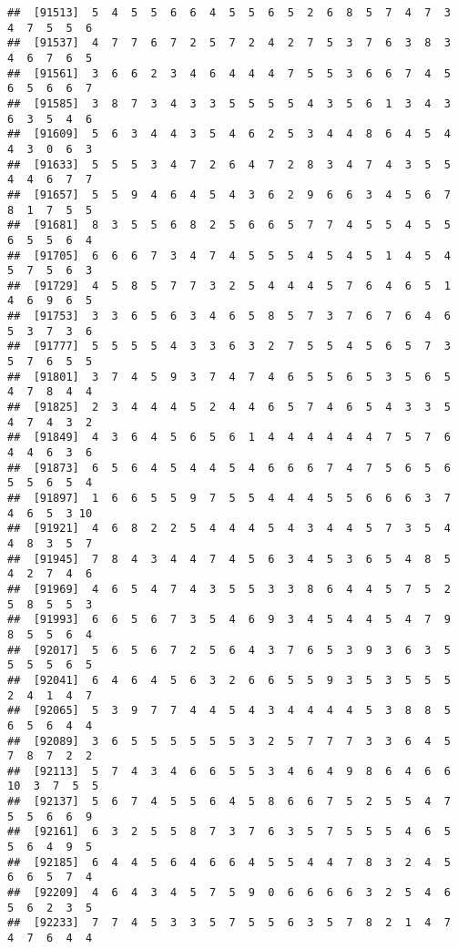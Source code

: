 \documentclass[
]{book}
\begin{document}
\begin{verbatim}
##  [91513]  5  4  5  5  6  6  4  5  5  6  5  2  6  8  5  7  4  7  3  4  7  5  5  6
##  [91537]  4  7  7  6  7  2  5  7  2  4  2  7  5  3  7  6  3  8  3  4  6  7  6  5
##  [91561]  3  6  6  2  3  4  6  4  4  4  7  5  5  3  6  6  7  4  5  6  5  6  6  7
##  [91585]  3  8  7  3  4  3  3  5  5  5  5  4  3  5  6  1  3  4  3  6  3  5  4  6
##  [91609]  5  6  3  4  4  3  5  4  6  2  5  3  4  4  8  6  4  5  4  4  3  0  6  3
##  [91633]  5  5  5  3  4  7  2  6  4  7  2  8  3  4  7  4  3  5  5  4  4  6  7  7
##  [91657]  5  5  9  4  6  4  5  4  3  6  2  9  6  6  3  4  5  6  7  8  1  7  5  5
##  [91681]  8  3  5  5  6  8  2  5  6  6  5  7  7  4  5  5  4  5  5  6  5  5  6  4
##  [91705]  6  6  6  7  3  4  7  4  5  5  5  4  5  4  5  1  4  5  4  5  7  5  6  3
##  [91729]  4  5  8  5  7  7  3  2  5  4  4  4  5  7  6  4  6  5  1  4  6  9  6  5
##  [91753]  3  3  6  5  6  3  4  6  5  8  5  7  3  7  6  7  6  4  6  5  3  7  3  6
##  [91777]  5  5  5  5  4  3  3  6  3  2  7  5  5  4  5  6  5  7  3  5  7  6  5  5
##  [91801]  3  7  4  5  9  3  7  4  7  4  6  5  5  6  5  3  5  6  5  4  7  8  4  4
##  [91825]  2  3  4  4  4  5  2  4  4  6  5  7  4  6  5  4  3  3  5  4  7  4  3  2
##  [91849]  4  3  6  4  5  6  5  6  1  4  4  4  4  4  4  7  5  7  6  4  4  6  3  6
##  [91873]  6  5  6  4  5  4  4  5  4  6  6  6  7  4  7  5  6  5  6  5  5  6  5  4
##  [91897]  1  6  6  5  5  9  7  5  5  4  4  4  5  5  6  6  6  3  7  4  6  5  3 10
##  [91921]  4  6  8  2  2  5  4  4  4  5  4  3  4  4  5  7  3  5  4  4  8  3  5  7
##  [91945]  7  8  4  3  4  4  7  4  5  6  3  4  5  3  6  5  4  8  5  4  2  7  4  6
##  [91969]  4  6  5  4  7  4  3  5  5  3  3  8  6  4  4  5  7  5  2  5  8  5  5  3
##  [91993]  6  6  5  6  7  3  5  4  6  9  3  4  5  4  4  5  4  7  9  8  5  5  6  4
##  [92017]  5  6  5  6  7  2  5  6  4  3  7  6  5  3  9  3  6  3  5  5  5  5  6  5
##  [92041]  6  4  6  4  5  6  3  2  6  6  5  5  9  3  5  3  5  5  5  2  4  1  4  7
##  [92065]  5  3  9  7  7  4  4  5  4  3  4  4  4  4  5  3  8  8  5  6  5  6  4  4
##  [92089]  3  6  5  5  5  5  5  5  3  2  5  7  7  7  3  3  6  4  5  7  8  7  2  2
##  [92113]  5  7  4  3  4  6  6  5  5  3  4  6  4  9  8  6  4  6  6 10  3  7  5  5
##  [92137]  5  6  7  4  5  5  6  4  5  8  6  6  7  5  2  5  5  4  7  5  5  6  6  9
##  [92161]  6  3  2  5  5  8  7  3  7  6  3  5  7  5  5  5  4  6  5  5  6  4  9  5
##  [92185]  6  4  4  5  6  4  6  6  4  5  5  4  4  7  8  3  2  4  5  6  6  5  7  4
##  [92209]  4  6  4  3  4  5  7  5  9  0  6  6  6  6  3  2  5  4  6  5  6  2  3  5
##  [92233]  7  7  4  5  3  3  5  7  5  5  6  3  5  7  8  2  1  4  7  4  7  6  4  4

\end{verbatim}
\end{document}
